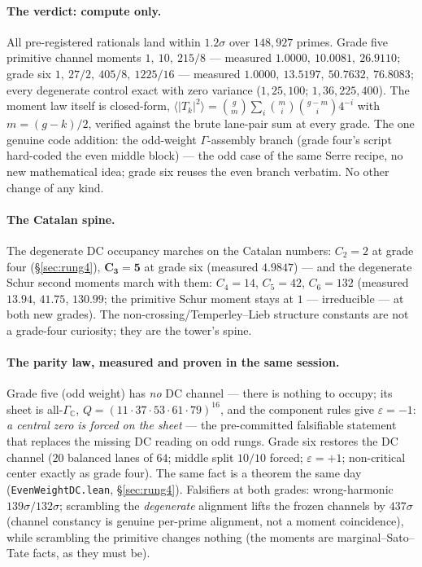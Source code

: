 \documentclass[11pt]{article}
\theoremstyle{definition}
\theoremstyle{remark}
\begin{document}
\paragraph{The verdict: compute only.} All pre-registered rationals land
within $1.2\sigma$ over $148{,}927$ primes. Grade five primitive channel
moments $1,\ 10,\ 215/8$ --- measured $1.0000,\ 10.0081,\ 26.9110$; grade six
$1,\ 27/2,\ 405/8,\ 1225/16$ --- measured $1.0000,\ 13.5197,\ 50.7632,\
76.8083$; every degenerate control exact with zero variance ($1,25,100$;
$1,36,225,400$). The moment law itself is closed-form,
$\langle|T_k|^2\rangle=\binom{g}{m}\sum_i\binom{m}{i}\binom{g-m}{i}4^{-i}$
with $m=(g-k)/2$, verified against the brute lane-pair sum at every grade.
The one genuine code addition: the odd-weight $\Gamma$-assembly branch
(grade four's script hard-coded the even middle block) --- the odd case of
the same Serre recipe, no new mathematical idea; grade six reuses the even
branch verbatim. No other change of any kind.

\paragraph{The Catalan spine.} The degenerate DC occupancy marches on the
Catalan numbers: $C_2=2$ at grade four (\S\ref{sec:rung4}),
$\mathbf{C_3=5}$ at grade six (measured $4.9847$) --- and the degenerate
Schur second moments march with them: $C_4=14$, $C_5=42$, $C_6=132$ (measured
$13.94$, $41.75$, $130.99$; the primitive Schur moment stays at $1$ ---
irreducible --- at both new grades). The non-crossing/Temperley--Lieb
structure constants are not a grade-four curiosity; they are the tower's
spine.

\paragraph{The parity law, measured and proven in the same session.} Grade
five (odd weight) has \emph{no} DC channel --- there is nothing to occupy;
its sheet is all-$\Gamma_{\mathbb C}$,
$Q=(11\cdot37\cdot53\cdot61\cdot79)^{16}$, and the component rules give
$\varepsilon=-1$: \emph{a central zero is forced on the sheet} --- the
pre-committed falsifiable statement that replaces the missing DC reading on
odd rungs. Grade six restores the DC channel ($20$ balanced lanes of $64$;
middle split $10/10$ forced; $\varepsilon=+1$; non-critical center exactly as
grade four). The same fact is a theorem the same day
(\texttt{EvenWeightDC.lean}, \S\ref{sec:rung4}). Falsifiers at both grades:
wrong-harmonic $139\sigma/132\sigma$; scrambling the \emph{degenerate}
alignment lifts the frozen channels by $437\sigma$ (channel constancy is
genuine per-prime alignment, not a moment coincidence), while scrambling the
primitive changes nothing (the moments are marginal--Sato--Tate facts, as
they must be).
\end{document}
